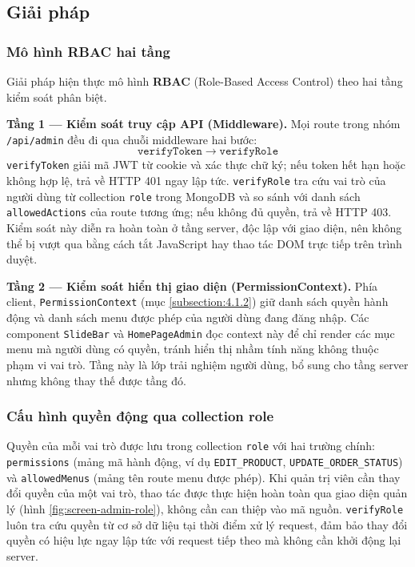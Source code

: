 \documentclass[../DoAn.tex]{subfiles}
\begin{document}
\subsection{Giải pháp}
\label{subsection:5.2.2}

\subsubsection*{Mô hình RBAC hai tầng}

Giải pháp hiện thực mô hình \textbf{RBAC} (Role-Based Access Control) theo hai
tầng kiểm soát phân biệt.

\textbf{Tầng 1 --- Kiểm soát truy cập API (Middleware).} Mọi route trong nhóm
\texttt{/api/admin} đều đi qua chuỗi middleware hai bước:
\[
  \texttt{verifyToken} \;\longrightarrow\; \texttt{verifyRole}
\]
\texttt{verifyToken} giải mã JWT từ cookie và xác thực chữ ký; nếu token hết
hạn hoặc không hợp lệ, trả về HTTP 401 ngay lập tức. \texttt{verifyRole} tra
cứu vai trò của người dùng từ collection \texttt{role} trong MongoDB và so
sánh với danh sách \texttt{allowedActions} của route tương ứng; nếu không đủ
quyền, trả về HTTP 403. Kiểm soát này diễn ra hoàn toàn ở tầng server, độc
lập với giao diện, nên không thể bị vượt qua bằng cách tắt JavaScript hay
thao tác DOM trực tiếp trên trình duyệt.

\textbf{Tầng 2 --- Kiểm soát hiển thị giao diện (PermissionContext).} Phía
client, \texttt{PermissionContext} (mục \ref{subsection:4.1.2}) giữ danh sách
quyền hành động và danh sách menu được phép của người dùng đang đăng nhập.
Các component \texttt{SlideBar} và \texttt{HomePageAdmin} đọc context này để
chỉ render các mục menu mà người dùng có quyền, tránh hiển thị nhầm tính năng
không thuộc phạm vi vai trò. Tầng này là lớp trải nghiệm người dùng, bổ sung
cho tầng server nhưng không thay thế được tầng đó.

\subsubsection*{Cấu hình quyền động qua collection role}

Quyền của mỗi vai trò được lưu trong collection \texttt{role} với hai trường
chính: \texttt{permissions} (mảng mã hành động, ví dụ \texttt{EDIT\_PRODUCT}, \break
\texttt{UPDATE\_ORDER\_STATUS}) và \texttt{allowedMenus} (mảng tên route menu
được phép). Khi quản trị viên cần thay đổi quyền của một vai trò, thao tác
được thực hiện hoàn toàn qua giao diện quản lý (hình \ref{fig:screen-admin-role}),
không cần can thiệp vào mã nguồn. \break \texttt{verifyRole} luôn tra cứu quyền từ
cơ sở dữ liệu tại thời điểm xử lý request, đảm bảo thay đổi quyền có hiệu
lực ngay lập tức với request tiếp theo mà không cần khởi động lại server.
\end{document}
